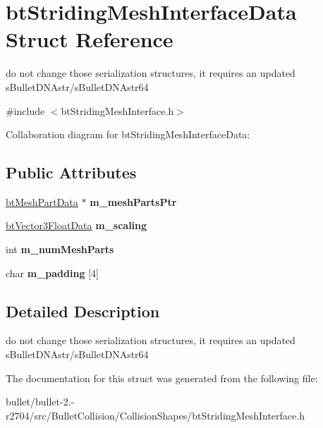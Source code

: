 \hypertarget{structbt_striding_mesh_interface_data}{\section{bt\+Striding\+Mesh\+Interface\+Data Struct Reference}
\label{structbt_striding_mesh_interface_data}
}


do not change those serialization structures, it requires an updated s\+Bullet\+D\+N\+Astr/s\+Bullet\+D\+N\+Astr64  




{\ttfamily \#include $<$bt\+Striding\+Mesh\+Interface.\+h$>$}



Collaboration diagram for bt\+Striding\+Mesh\+Interface\+Data\+:
\subsection*{Public Attributes}
\begin{DoxyCompactItemize}
\item 
\hypertarget{structbt_striding_mesh_interface_data_a62938be6739d1e86a377b33e8ffecbdb}{\hyperlink{structbt_mesh_part_data}{bt\+Mesh\+Part\+Data} $\ast$ {\bfseries m\+\_\+mesh\+Parts\+Ptr}}\label{structbt_striding_mesh_interface_data_a62938be6739d1e86a377b33e8ffecbdb}

\item 
\hypertarget{structbt_striding_mesh_interface_data_af5cad63f6d700f3993611d958222c288}{\hyperlink{structbt_vector3_float_data}{bt\+Vector3\+Float\+Data} {\bfseries m\+\_\+scaling}}\label{structbt_striding_mesh_interface_data_af5cad63f6d700f3993611d958222c288}

\item 
\hypertarget{structbt_striding_mesh_interface_data_a648047136aef434d7cd738a0175cf80c}{int {\bfseries m\+\_\+num\+Mesh\+Parts}}\label{structbt_striding_mesh_interface_data_a648047136aef434d7cd738a0175cf80c}

\item 
\hypertarget{structbt_striding_mesh_interface_data_afddf31910fb3c21906011837c069c62b}{char {\bfseries m\+\_\+padding} \mbox{[}4\mbox{]}}\label{structbt_striding_mesh_interface_data_afddf31910fb3c21906011837c069c62b}

\end{DoxyCompactItemize}


\subsection{Detailed Description}
do not change those serialization structures, it requires an updated s\+Bullet\+D\+N\+Astr/s\+Bullet\+D\+N\+Astr64 

The documentation for this struct was generated from the following file\+:\begin{DoxyCompactItemize}
\item 
bullet/bullet-\/2.-\/r2704/src/\+Bullet\+Collision/\+Collision\+Shapes/bt\+Striding\+Mesh\+Interface.\+h\end{DoxyCompactItemize}
